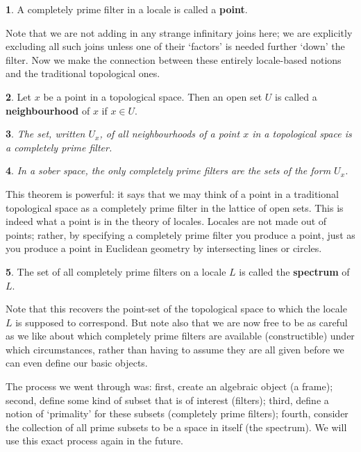 \documentclass[oneside,english]{amsbook}
\numberwithin{section}{chapter}
\theoremstyle{plain}
\newtheorem{thm}{\protect\theoremname}
\theoremstyle{definition}
\newtheorem{defn}[thm]{\protect\definitionname}
\providecommand{\definitionname}{Definition}
\providecommand{\theoremname}{Theorem}
\begin{document}
\begin{defn} 
	A completely prime filter in a locale is called a \textbf{point}. 
\end{defn}

Note that we are not adding in any strange infinitary joins here; we are explicitly excluding all such joins unless one of their `factors' is needed further `down' the filter. Now we make the connection between these entirely locale-based notions and the traditional topological ones.

\begin{defn}
	Let $x$ be a point in a topological space. Then an open set $U$ is called a \textbf{neighbourhood} of $x$ if $x\in U$.\end{defn}

\begin{thm}
	The set, written $U_x$, of all neighbourhoods of a point $x$ in a topological space is a completely prime filter.
\end{thm}

\begin{thm}
	In a sober space, the only completely prime filters are the sets of the form $U_x$.
\end{thm}

This theorem is powerful: it says that we may think of a point in a traditional topological space as a completely prime filter in the lattice of open sets. This is indeed what a point is in the theory of locales. Locales are not made out of points; rather, by specifying a completely prime filter you produce a point, just as you produce a point in Euclidean geometry by intersecting lines or circles.

\begin{defn}
	The set of all completely prime filters on a locale $L$ is called the \textbf{spectrum} of $L$.
\end{defn}

Note that this recovers the point-set of the topological space to which the locale $L$ is supposed to correspond. But note also that we are now free to be as careful as we like about which completely prime filters are available (constructible) under which circumstances, rather than having to assume they are all given before we can even define our basic objects.

The process we went through was: first, create an algebraic object (a frame); second, define some kind of subset that is of interest (filters); third, define a notion of `primality' for these subsets (completely prime filters); fourth, consider the collection of all prime subsets to be a space in itself (the spectrum). We will use this exact process again in the future.
\end{document}

